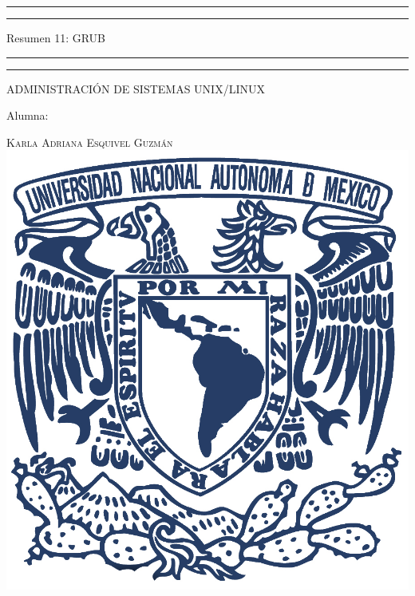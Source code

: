 \documentclass[a4paper, 11pt, oneside]{article}
\begin{document}
 

\begin{titlepage} 

	\centering 
	
	\scshape 
	
	\vspace*{\baselineskip} 
	
	
	
	\rule{\textwidth}{1.6pt}\vspace*{-\baselineskip}\vspace*{2pt} 
	\rule{\textwidth}{0.4pt} 
	
	\vspace{0.75\baselineskip} 
	
	{\LARGE Resumen 11: GRUB}	
	\vspace{0.75\baselineskip} 
	
	\rule{\textwidth}{0.4pt}\vspace*{-\baselineskip}\vspace{3.2pt}
	\rule{\textwidth}{1.6pt} 
	
	\vspace{2\baselineskip} 
	

	ADMINISTRACIÓN DE SISTEMAS UNIX/LINUX
	
	\vspace*{3\baselineskip} 
	
	
	
	Alumna:
	
	\vspace{0.5\baselineskip} 
	
	{\scshape\Large Karla Adriana Esquivel Guzmán \\} 
	\vspace{0.5\baselineskip} 
	\vfill
	\includegraphics{unam.jpg}
	

\end{titlepage}
\end{document}
